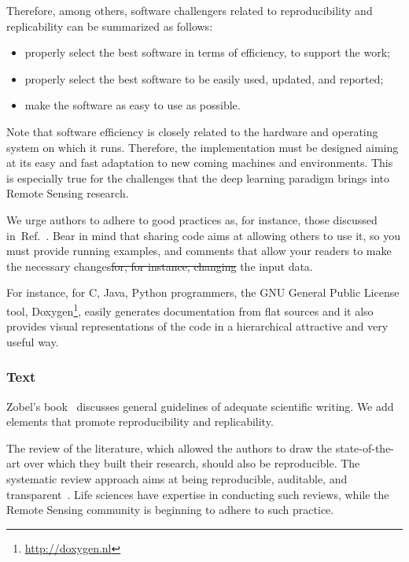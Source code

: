 \documentclass[journal,twoside]{IEEEtran}
\providecommand{\DIFadd}[1]{{\protect\color{blue}\uwave{#1}}} %
\providecommand{\DIFdel}[1]{{\protect\color{red}\sout{#1}}}                      %
\providecommand{\DIFaddbegin}{} %
\providecommand{\DIFaddend}{} %
\providecommand{\DIFdelbegin}{} %
\providecommand{\DIFdelend}{} %
\newcommand{\DIFscaledelfig}{0.5}
\newlength{\DIFdelgraphicswidth} %
\newlength{\DIFdelgraphicsheight} %
\newcommand{\DIFaddincludegraphics}[2][]{{\color{blue}\fbox{\DIFOincludegraphics[#1]{#2}}}} %
\newcommand{\DIFdelincludegraphics}[2][]{%
\sbox{\DIFdelgraphicsbox}{\DIFOincludegraphics[#1]{#2}}%
\settoboxwidth{\DIFdelgraphicswidth}{\DIFdelgraphicsbox} %
\settoboxtotalheight{\DIFdelgraphicsheight}{\DIFdelgraphicsbox} %
\scalebox{\DIFscaledelfig}{%
\parbox[b]{\DIFdelgraphicswidth}{\usebox{\DIFdelgraphicsbox}\\[-\baselineskip] \rule{\DIFdelgraphicswidth}{0em}}\llap{\resizebox{\DIFdelgraphicswidth}{\DIFdelgraphicsheight}{%
\setlength{\unitlength}{\DIFdelgraphicswidth}%
\begin{picture}(1,1)%
\thicklines\linethickness{2pt} %
{\color[rgb]{1,0,0}\put(0,0){\framebox(1,1){}}}%
{\color[rgb]{1,0,0}\put(0,0){\line( 1,1){1}}}%
{\color[rgb]{1,0,0}\put(0,1){\line(1,-1){1}}}%
\end{picture}%
}\hspace*{3pt}}} %
} %
\DeclareRobustCommand{\DIFaddbegin}{\DIFOaddbegin \let\includegraphics\DIFaddincludegraphics} %
\DeclareRobustCommand{\DIFaddend}{\DIFOaddend \let\includegraphics\DIFOincludegraphics} %
\DeclareRobustCommand{\DIFdelbegin}{\DIFOdelbegin \let\includegraphics\DIFdelincludegraphics} %
\DeclareRobustCommand{\DIFdelend}{\DIFOaddend \let\includegraphics\DIFOincludegraphics} %
\begin{document}
Therefore, among others, software challengers related to reproducibility and replicability can be summarized as follows:
\begin{itemize}
	\item properly select the best software in terms of efficiency, to support the work;
	\item properly select the best software to be easily used, updated, and reported;
	\item make the software as easy to use as possible.
\end{itemize}

Note that software efficiency is closely related to the hardware and operating system on which it runs.
Therefore, the implementation must be designed aiming at its easy and fast adaptation to new coming machines and environments. 
This is especially true for the challenges that the deep learning paradigm brings into Remote Sensing research.

We urge authors to adhere to good practices as, for instance, those discussed in~Ref.~\cite[Chapter 7]{WritingScientificSoftware}.
Bear in mind that sharing code aims at allowing others to use it, so you must provide running examples, and comments that allow your readers to make the necessary changes\DIFdelbegin \DIFdel{for, for instance, changing }\DIFdelend \DIFaddbegin \DIFadd{, for example on how to change }\DIFaddend the input data.

For instance, for C, Java, Python programmers, the  GNU General Public License tool, Doxygen\footnote{\url{http://doxygen.nl}}, easily generates documentation from flat sources and it also provides visual representations of the code in a hierarchical attractive and very useful way.

\subsubsection{Text}

Zobel's book~\cite{WritingforComputerScience} discusses general guidelines of adequate scientific writing.
We add elements that promote reproducibility and replicability.

The review of the literature, which allowed the authors to draw the state-of-the-art over which they built their research, should also be reproducible.
The systematic review approach aims at being reproducible, auditable, and transparent~\cite{TowardsaMethodologyforDevelopingEvidenceInformedManagementKnowledgebyMeansofSystematicReview}.
Life sciences have expertise in conducting such reviews, while the Remote Sensing community is beginning to adhere to such practice.
\end{document}

